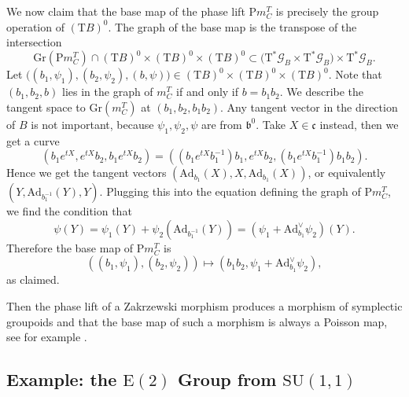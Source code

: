 \documentclass[a4paper,11pt]{amsart}
\newcommand{\s}[1]{\mathcal{#1}}
\newcommand{\fr}[1]{\mathfrak{#1}}
\newcommand{\rP}{\mathrm P}
\newcommand{\rT}{\mathrm T}
\newcommand{\Ad}{\mathrm{Ad}}
\newcommand{\SU}{\mathrm{SU}}
\newcommand{\rE}{\mathrm{E}}
\newcommand{\Gr}{\mathrm{Gr}}
\theoremstyle{definition}
\theoremstyle{remark}
\begin{document}
We now claim that the base map of the phase lift $\rP m_C^T$ is precisely the group operation of $(\rT B)^0$.
The graph of the base map is the transpose of the intersection
\begin{equation*}
	\Gr( \rP m_C^T ) \cap (\rT B)^0 \times (\rT B)^0 \times (\rT B)^0 \subset \bigl( \rT^* \s{G}_B \times \rT^* \s{G}_B \bigr) \times \rT^* \s{G}_B .
\end{equation*}
Let $\bigl( (b_1, \psi_1) , (b_2, \psi_2) , (b, \psi) \bigr) \in (\rT B)^0 \times (\rT B)^0 \times (\rT B)^0$.
Note that $(b_1,b_2,b)$ lies in the graph of $m_C^T$ if and only if $b = b_1 b_2$.
We describe the tangent space to $\Gr( m_C^T)$ at $(b_1,b_2,b_1 b_2)$.
Any tangent vector in the direction of $B$ is not important, because $\psi_1,\psi_2,\psi$ are from $\fr{b}^0$.
Take $X \in \fr{c}$ instead, then we get a curve
\begin{equation*}
\left( b_1 e^{t X}, e^{t X} b_2, b_1 e^{t X} b_2 \right) = \left( \left( b_1 e^{t X} b_1^{-1} \right) b_1, e^{t X} b_2, \left( b_1 e^{t X} b_1^{-1} \right) b_1 b_2 \right) .
\end{equation*}
Hence we get the tangent vectors $( \Ad_{b_1} (X) , X , \Ad_{b_1} (X) )$, or equivalently $( Y , \Ad_{b_1^{-1}} (Y) , Y )$.
Plugging this into the equation defining the graph of $\rP m_C^T$, we find the condition that
\[
 \psi(Y) = \psi_1(Y) + \psi_2( \Ad_{b_1^{-1}} (Y) ) = \left( \psi_1 + \Ad^\vee_{b_1} \psi_2 \right) (Y) .
\]
Therefore the base map of $\rP m_C^T$ is
\begin{equation*}
\left( (b_1, \psi_1) , (b_2, \psi_2) \right) \mapsto \left( b_1 b_2 , \psi_1 + \Ad^\vee_{b_1} \psi_2 \right) ,
\end{equation*}
as claimed.

Then the phase lift of a Zakrzewski morphism produces a morphism of symplectic groupoids and that the base map of such a morphism is always a Poisson map, see for example .

\subsection{Example: the \texorpdfstring{$\rE(2)$}{E(2)} Group from \texorpdfstring{$\SU(1,1)$}{SU(1,1)}}
\label{sec:exmpl-e2-from-su11}
\end{document}
